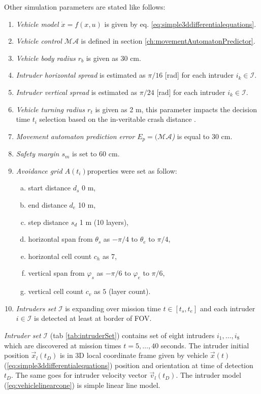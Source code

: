 \noindent Other simulation parameters are stated like follows:
\begin{enumerate}
    \item\emph{Vehicle model $\dot{x}=f(x,u)$} is given by eq. \ref{eq:simple3ddifferentialequations}.
    \item\emph{Vehicle control $\mathscr{MA}$} is defined in section \ref{ch:movementAutomatonPredictor}.
    \item\emph{Vehicle body radius $r_b$} is given as 30 cm.
    \item\emph{Intruder horizontal spread} is estimated as $\pi/16$ [rad] for each intruder $i_k\in\mathscr{I}$.
    \item\emph{Intruder vertical spread} is estimated as $\pi/24$ [rad] for each intruder $i_k\in\mathscr{I}$.
    \item\emph{Vehicle turning radius $r_t$} is given as 2 m, this parameter impacts the decision time $t_i$ selection based on the in-veritable crash distance \cite{alojzgomola2017}.
    \item\emph{Movement automaton prediction error $E_p=(\mathscr{MA}$)} is equal to 30 cm.
    \item\emph{Safety margin $s_m$} is set to 60 cm.
    \item\emph{Avoidance grid $A(t_i) $}properties were set as follow:
    \begin{enumerate}[a.]
        \item start distance $d_s$ 0 m,
        \item end distance $d_e$ 10 m,
        \item step distance $s_d$ 1 m (10 layers),
        \item horizontal span from $\theta_s$ as $-\pi/4$ to $\theta_e$ to $\pi/4$,
        \item horizontal cell count $c_h$ as $7$,
        \item vertical span from $\varphi_s$ as $-\pi/6$ to $\varphi_e$ to $\pi/6$,
        \item vertical cell count $c_v$ as $5$ (layer count).
    \end{enumerate}
    \item\emph{Intruders set} $\mathscr{I}$ is expanding over mission time $t\in[t_s,t_e]$ and each intruder $i\in\mathscr{I}$ is detected at least at border of FOV.
\end{enumerate}

\noindent\emph{Intruder set} $\mathscr{I}$ (tab \ref{tab:intruderSet}) contains set of eight intruders $i_1,\dots,i_8$ which are discovered at mission times $t=5,\dots,40$ seconds. The intruder initial position $\vec{x}_{l}(t_D)$ is in 3D local coordinate frame given by vehicle $\vec{x}(t)$ (\ref{eq:simple3ddifferentialequations}) position and orientation at time of detection $t_D$. The same goes for intruder velocity vector $\vec{v}_{l}(t_D)$. The intruder model (\ref{eq:vehiclelinearcone}) is simple linear line model. 


